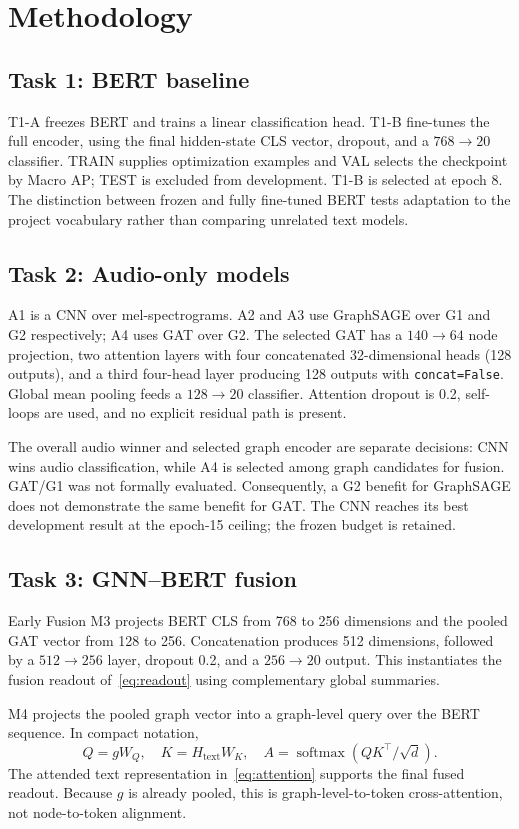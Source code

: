 \documentclass[conference]{IEEEtran}
\begin{document}
\section{Methodology}\label{sec:methods}
\subsection{Task 1: BERT baseline}
T1-A freezes BERT and trains a linear classification head. T1-B fine-tunes the full encoder, using the final hidden-state CLS vector, dropout, and a $768\to20$ classifier. TRAIN supplies optimization examples and VAL selects the checkpoint by Macro AP; TEST is excluded from development. T1-B is selected at epoch 8. The distinction between frozen and fully fine-tuned BERT tests adaptation to the project vocabulary rather than comparing unrelated text models.

\subsection{Task 2: Audio-only models}
A1 is a CNN over mel-spectrograms. A2 and A3 use GraphSAGE over G1 and G2 respectively; A4 uses GAT over G2. The selected GAT has a $140\to64$ node projection, two attention layers with four concatenated 32-dimensional heads (128 outputs), and a third four-head layer producing 128 outputs with \texttt{concat=False}. Global mean pooling feeds a $128\to20$ classifier. Attention dropout is 0.2, self-loops are used, and no explicit residual path is present.

The overall audio winner and selected graph encoder are separate decisions: CNN wins audio classification, while A4 is selected among graph candidates for fusion. GAT/G1 was not formally evaluated. Consequently, a G2 benefit for GraphSAGE does not demonstrate the same benefit for GAT. The CNN reaches its best development result at the epoch-15 ceiling; the frozen budget is retained.

\subsection{Task 3: GNN--BERT fusion}
Early Fusion M3 projects BERT CLS from 768 to 256 dimensions and the pooled GAT vector from 128 to 256. Concatenation produces 512 dimensions, followed by a $512\to256$ layer, dropout 0.2, and a $256\to20$ output. This instantiates the fusion readout of~\eqref{eq:readout} using complementary global summaries.

M4 projects the pooled graph vector into a graph-level query over the BERT sequence. In compact notation,
\begin{equation}
Q=gW_Q,\quad K=H_{\mathrm{text}}W_K,\quad A=\operatorname{softmax}(QK^\top/\sqrt d).
\label{eq:attention}
\end{equation}
The attended text representation in~\eqref{eq:attention} supports the final fused readout. Because $g$ is already pooled, this is graph-level-to-token cross-attention, not node-to-token alignment.
\end{document}
